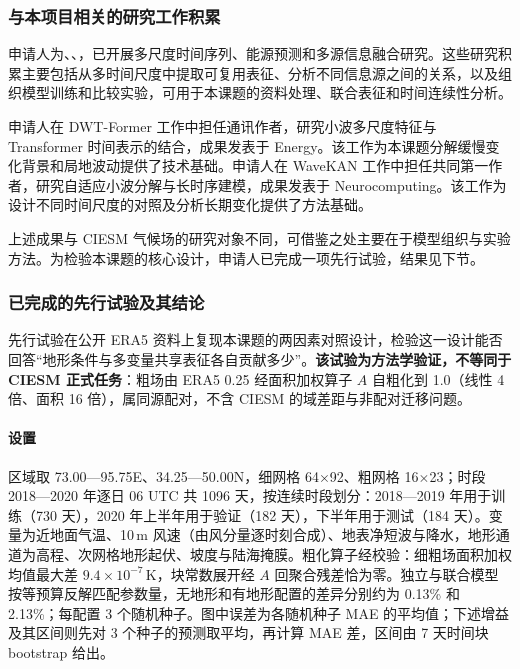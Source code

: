 \subsubsection{与本项目相关的研究工作积累}

申请人为、、，已开展多尺度时间序列、能源预测和多源信息融合研究。这些研究积累主要包括从多时间尺度中提取可复用表征、分析不同信息源之间的关系，以及组织模型训练和比较实验，可用于本课题的资料处理、联合表征和时间连续性分析。

申请人在 DWT-Former 工作中担任通讯作者，研究小波多尺度特征与 Transformer 时间表示的结合，成果发表于 Energy\cite{DWT2025}。该工作为本课题分解缓慢变化背景和局地波动提供了技术基础。申请人在 WaveKAN 工作中担任共同第一作者，研究自适应小波分解与长时序建模，成果发表于 Neurocomputing\cite{WaveKAN2026}。该工作为设计不同时间尺度的对照及分析长期变化提供了方法基础。

上述成果与 CIESM 气候场的研究对象不同，可借鉴之处主要在于模型组织与实验方法。为检验本课题的核心设计，申请人已完成一项先行试验，结果见下节。

\subsubsection{已完成的先行试验及其结论}

先行试验在公开 ERA5 资料上复现本课题的两因素对照设计，检验这一设计能否回答“地形条件与多变量共享表征各自贡献多少”。\textbf{该试验为方法学验证，不等同于 CIESM 正式任务}：粗场由 ERA5 0.25\textdegree{} 经面积加权算子 $A$ 自粗化到 1.0\textdegree{}（线性 4 倍、面积 16 倍），属同源配对，不含 CIESM 的域差距与非配对迁移问题。

\paragraph{设置}
区域取 73.00—95.75\textdegree{}E、34.25—50.00\textdegree{}N，细网格 64$\times$92、粗网格 16$\times$23；时段 2018—2020 年逐日 06 UTC 共 1096 天，按连续时段划分：2018—2019 年用于训练（730 天），2020 年上半年用于验证（182 天），下半年用于测试（184 天）。变量为近地面气温、10\,m 风速（由风分量逐时刻合成）、地表净短波与降水，地形通道为高程、次网格地形起伏、坡度与陆海掩膜。粗化算子经校验：细粗场面积加权均值最大差 $9.4\times10^{-7}$\,K，块常数展开经 $A$ 回聚合残差恰为零。独立与联合模型按等预算反解匹配参数量，无地形和有地形配置的差异分别约为 0.13\% 和 2.13\%；每配置 3 个随机种子。图中误差为各随机种子 MAE 的平均值；下述增益及其区间则先对 3 个种子的预测取平均，再计算 MAE 差，区间由 7 天时间块 bootstrap 给出。

